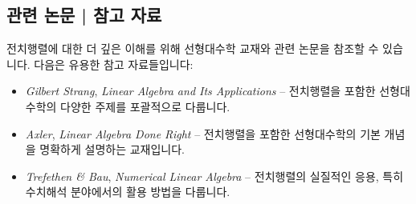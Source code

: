 \subsection{관련 논문 | 참고 자료}
전치행렬에 대한 더 깊은 이해를 위해 선형대수학 교재와 관련 논문을 참조할 수 있습니다. 다음은 유용한 참고 자료들입니다:

\begin{itemize}
  \item \textit{Gilbert Strang}, \textit{Linear Algebra and Its Applications} – 전치행렬을 포함한 선형대수학의 다양한 주제를 포괄적으로 다룹니다.
  \item \textit{Axler}, \textit{Linear Algebra Done Right} – 전치행렬을 포함한 선형대수학의 기본 개념을 명확하게 설명하는 교재입니다.
  \item \textit{Trefethen \& Bau}, \textit{Numerical Linear Algebra} – 전치행렬의 실질적인 응용, 특히 수치해석 분야에서의 활용 방법을 다룹니다.
\end{itemize}

